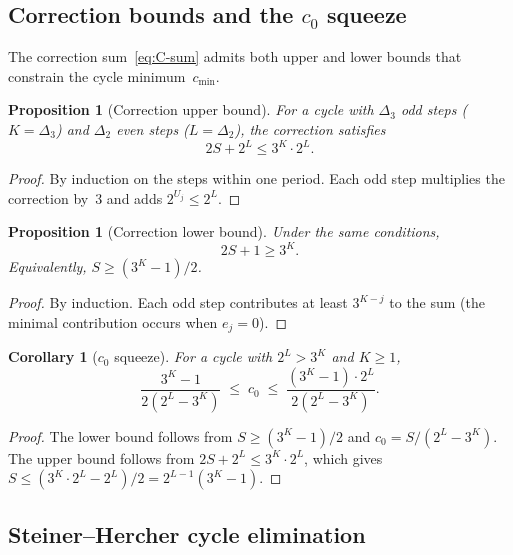 \documentclass[manuscript]{aomart}
\theoremstyle{plain}
\newtheorem{proposition}[theorem]{Proposition}
\newtheorem{corollary}[theorem]{Corollary}
\theoremstyle{definition}
\theoremstyle{remark}
\numberwithin{equation}{section}
\begin{document}
\subsection{Correction bounds and the $c_0$ squeeze}

The correction sum~\eqref{eq:C-sum} admits both upper and lower bounds
that constrain the cycle minimum~$c_{\min}$.

\begin{proposition}[Correction upper bound]\label{prop:corr-upper}
For a cycle with $\Delta_3$ odd steps ($K = \Delta_3$) and $\Delta_2$
even steps ($L = \Delta_2$), the correction satisfies
\[
  2S + 2^L \le 3^K \cdot 2^L.
\]
\end{proposition}

\begin{proof}
By induction on the steps within one period.  Each odd step
multiplies the correction by~$3$ and adds $2^{U_j} \le 2^L$.
\end{proof}

\begin{proposition}[Correction lower bound]\label{prop:corr-lower}
Under the same conditions,
\[
  2S + 1 \ge 3^K.
\]
Equivalently, $S \ge (3^K - 1)/2$.
\end{proposition}

\begin{proof}
By induction.  Each odd step contributes at least $3^{K-j}$ to the
sum (the minimal contribution occurs when $e_j = 0$).
\end{proof}

\begin{corollary}[$c_0$ squeeze]\label{cor:c0-squeeze}
For a cycle with $2^L > 3^K$ and $K \ge 1$,
\begin{equation}\label{eq:c0-squeeze}
  \frac{3^K - 1}{2(2^L - 3^K)} \;\le\; c_0 \;\le\;
  \frac{(3^K - 1) \cdot 2^L}{2(2^L - 3^K)}.
\end{equation}
\end{corollary}

\begin{proof}
The lower bound follows from $S \ge (3^K - 1)/2$ and
$c_0 = S/(2^L - 3^K)$.  The upper bound follows from $2S + 2^L \le
3^K \cdot 2^L$, which gives $S \le (3^K \cdot 2^L - 2^L)/2 =
2^{L-1}(3^K - 1)$.
\end{proof}

\subsection{Steiner--Hercher cycle elimination}
\end{document}

